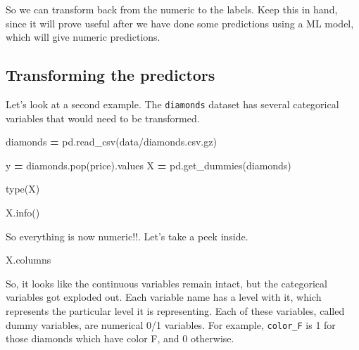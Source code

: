 \documentclass[
  letterpaper,
]{scrbook}
\newenvironment{Shaded}{\begin{snugshade}}{\end{snugshade}}
\newcommand{\BuiltInTok}[1]{#1}
\newcommand{\NormalTok}[1]{#1}
\newcommand{\OperatorTok}[1]{\textcolor[rgb]{0.81,0.36,0.00}{\textbf{#1}}}
\newcommand{\StringTok}[1]{\textcolor[rgb]{0.31,0.60,0.02}{#1}}
\begin{document}
So we can transform back from the numeric to the labels. Keep this in hand, since it will prove useful after
we have done some predictions using a ML model, which will give numeric predictions.

\hypertarget{transforming-the-predictors}{%
\subsection{Transforming the predictors}\label{transforming-the-predictors}}

Let's look at a second example. The \texttt{diamonds} dataset has several categorical variables that would need to be transformed.

\begin{Shaded}
\begin{Highlighting}[]
\NormalTok{diamonds }\OperatorTok{=}\NormalTok{ pd.read\_csv(}\StringTok{\textquotesingle{}data/diamonds.csv.gz\textquotesingle{}}\NormalTok{)}

\NormalTok{y }\OperatorTok{=}\NormalTok{ diamonds.pop(}\StringTok{\textquotesingle{}price\textquotesingle{}}\NormalTok{).values}
\NormalTok{X }\OperatorTok{=}\NormalTok{ pd.get\_dummies(diamonds)}
\end{Highlighting}
\end{Shaded}

\begin{Shaded}
\begin{Highlighting}[]
\BuiltInTok{type}\NormalTok{(X)}
\end{Highlighting}
\end{Shaded}

\begin{Shaded}
\begin{Highlighting}[]
\NormalTok{X.info()}
\end{Highlighting}
\end{Shaded}

So everything is now numeric!!. Let's take a peek inside.

\begin{Shaded}
\begin{Highlighting}[]
\NormalTok{X.columns}
\end{Highlighting}
\end{Shaded}

So, it looks like the continuous variables remain intact, but the categorical variables got exploded out. Each
variable name has a level with it, which represents the particular level it is representing. Each of these
variables, called dummy variables, are numerical 0/1 variables. For example, \texttt{color\_F} is 1 for those diamonds which have color F, and 0 otherwise.
\end{document}
